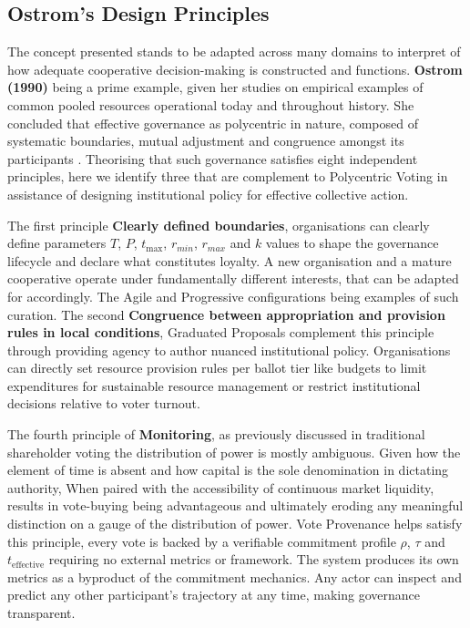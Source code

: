 \documentclass[a4paper,12pt]{article}
\begin{document}
\newpage 

\subsection{\signifier Ostrom's Design Principles}

The concept presented stands to be adapted across many domains to interpret of how adequate cooperative decision-making is constructed and functions. \textbf{Ostrom (1990)} being a prime example, given her studies on empirical examples of common pooled resources operational today and throughout history. She concluded that effective governance as polycentric in nature, composed of systematic boundaries, mutual adjustment and congruence amongst its participants \cite{ostrom1990}. Theorising that such governance satisfies eight independent principles, here we identify three that are complement to Polycentric Voting in assistance of designing institutional policy for effective collective action. 

The first principle \textbf{Clearly defined boundaries}, organisations can clearly define parameters $T$, $P$, $t_{\text{max}}$, $r_{min}$, $r_{max}$ and $k$ values to shape the governance lifecycle and declare what constitutes loyalty. A new organisation and a mature cooperative operate under fundamentally different interests, that can be adapted for accordingly. The Agile and Progressive configurations being examples of such curation. The second \textbf{Congruence between appropriation and provision rules in local conditions}, Graduated Proposals complement this principle through providing agency to author nuanced institutional policy. Organisations can directly set resource provision rules per ballot tier like budgets to limit expenditures for sustainable resource management or restrict institutional decisions relative to voter turnout.

The fourth principle of \textbf{Monitoring}, as previously discussed in traditional shareholder voting the distribution of power is mostly ambiguous. Given how the element of time is absent and how capital is the sole denomination in dictating authority, When paired with the accessibility of continuous market liquidity, results in vote-buying being advantageous and ultimately eroding any meaningful distinction on a gauge of the distribution of power. Vote Provenance helps satisfy this principle, every vote is backed by a verifiable commitment profile $\rho$, $\tau$ and $t_{\mathrm{effective}}$ requiring no external metrics or framework. The system produces its own metrics as a byproduct of the commitment mechanics. Any actor can inspect and predict any other participant's trajectory at any time, making governance transparent.
\end{document}
